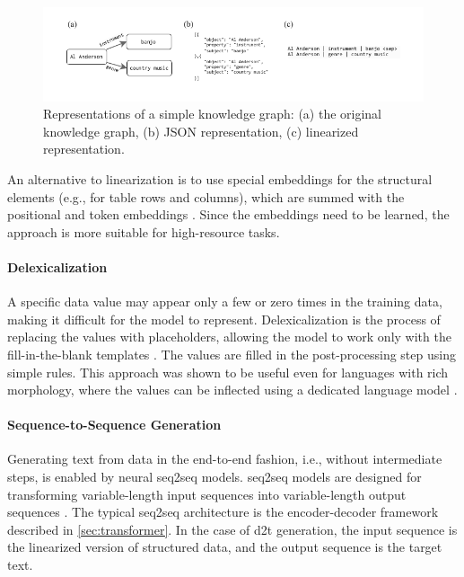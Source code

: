 {\begin{figure}[h]
    \centering
    \includegraphics[width=\textwidth]{img/linearization.pdf}

    \caption{Representations of a simple knowledge graph: (a) the original knowledge graph, (b) JSON representation, (c) linearized representation.}\label{fig:linearization}

\end{figure}

An alternative to linearization is to use special embeddings for the structural elements (e.g., for table rows and columns), which are summed with the positional and token embeddings \cite{wang2021tuta,yangTableFormerRobustTransformer2022}. Since the embeddings need to be learned, the approach is more suitable for high-resource tasks.

\paragraph{Delexicalization} A specific data value may appear only a few or zero times in the training data, making it difficult for the model to represent. Delexicalization is the process of replacing the values with placeholders, allowing the model to work only with the fill-in-the-blank templates \cite{oh2000stochastic,mairesse2010phrase,wen2015semantically,dusekSequencetoSequenceGenerationSpoken2016}. The values are filled in the post-processing step using simple rules. This approach was shown to be useful even for languages with rich morphology, where the values can be inflected using a dedicated language model \cite{duvsek2019neural}.

\paragraph{Sequence-to-Sequence Generation} Generating text from data in the end-to-end fashion, i.e., without intermediate steps, is enabled by neural \ac{seq2seq} models. \Ac{seq2seq} models are designed for transforming variable-length input sequences into variable-length output sequences \cite{cho2014learning,sutskever2014sequence}. The typical \ac{seq2seq} architecture is the encoder-decoder framework described in \autoref{sec:transformer}. In the case of \ac{d2t} generation, the input sequence is the linearized version of structured data, and the output sequence is the target text.

}
